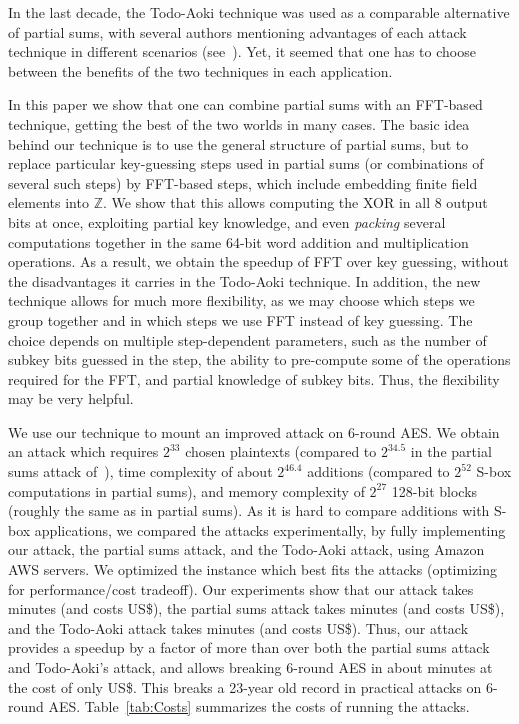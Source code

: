 In the last decade, the Todo-Aoki technique was used as a comparable alternative of partial sums, with several authors mentioning advantages of each attack technique in different scenarios (see~\cite{EPRINT:ADGLLT19,EC:BDDLKT15,RSA:CHWW22,ARXIV:YiCheWei14}). Yet, it seemed that one has to choose between the benefits of the two techniques in each application. 

In this paper we show that one can combine partial sums with an FFT-based technique, getting the best of the two worlds in many cases. The basic idea behind our technique is to use the general structure of partial sums, but to replace particular key-guessing steps used in partial sums (or combinations of several such steps) by FFT-based steps, which include embedding finite field elements into $\mathbb{Z}$. We show that this allows computing the XOR in all 8 output bits at once, exploiting partial key knowledge, and even {\it packing} several computations together in the same 64-bit word addition and multiplication operations. As a result, we obtain the speedup of FFT over key guessing, without the disadvantages it carries in the Todo-Aoki technique. In addition, the new technique allows for much more flexibility, as we may choose which steps we group together and in which steps we use FFT instead of key guessing. The choice depends on multiple step-dependent parameters, such as the number of subkey bits guessed in the step, the ability to pre-compute some of the operations required for the FFT, and partial knowledge of subkey bits. Thus, the flexibility may be very helpful.

We use our technique to mount an improved attack on 6-round AES. We obtain an attack which requires $2^{33}$ chosen plaintexts (compared to $2^{34.5}$ in the partial sums attack of~\cite{FSE:FKLSSWW00}), time complexity of about $2^{46.4}$ additions (compared to $2^{52}$ S-box computations in partial sums), and memory complexity of $2^{27}$ 128-bit blocks (roughly the same as in partial sums). As it is hard to compare additions with S-box applications, we compared the attacks experimentally, by fully implementing our attack, the partial sums attack, and the Todo-Aoki attack, using Amazon AWS servers. We optimized the instance which best fits the attacks (optimizing for performance/cost tradeoff). 
Our experiments show that our attack takes \timeOur minutes (and costs \priceOur US\$), the partial sums attack takes \timePartial minutes (and costs \pricePartial US\$), and the Todo-Aoki attack takes \timeFFT minutes (and costs \priceFFT US\$). Thus, our attack provides a speedup by a factor of more than \speedup over both the partial sums attack and Todo-Aoki's attack, and allows breaking 6-round AES in about \timeOur minutes at the cost of only \priceOur US\$. This breaks a 23-year old record in practical attacks on 6-round AES. Table~\ref{tab:Costs} summarizes the costs of running the attacks. 

